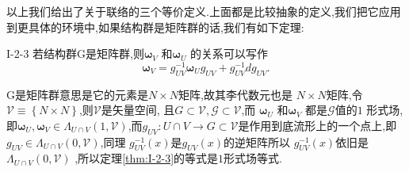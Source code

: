 \documentclass[../main.tex]{subfiles}
\begin{document}
以上我们给出了关于联络的三个等价定义.上面都是比较抽象的定义,我们把它应用到更具体的环境中,如果结构群是矩阵群的话,我们有如下定理:
\begin{theorem}
  {}{I-2-3}
  若结构群G是矩阵群,则$\bm{\omega}_V $ 和$\bm{\omega}_U $ 的关系可以写作\[
    \bm{\omega}_V = g_{UV}^{-1}\bm{\omega}_U g_{UV}^{} + g_{UV}^{-1} d g_{UV}^{}
  .\] 
\end{theorem}
\begin{note}
  G是矩阵群意思是它的元素是$N \times N$矩阵,故其李代数元也是 $N\times N$矩阵,令$\mathscr{V} \equiv \left\{ N\times N \right\} $,则$\mathscr{V}$是矢量空间,
  且$G \subset \mathscr{V},\mathscr{G}\subset \mathscr{V}$,而 $\bm{\omega}_U $ 和$\bm{\omega}_V $ 都是$\mathscr{G}$值的$1$ 形式场,即$\bm{\omega}_U,\bm{\omega}_V \in \Lambda_{U\cap V}(1,\mathscr{V})$,而$g_{UV}:U\cap V \rightarrow G \subset \mathscr{V}$是作用到底流形上的一个点上,即$g_{UV} \in \Lambda_{U\cap V}(0,\mathscr{V})$,同理 $g_{UV}^{-1}(x)$是$g_{UV}(x)$的逆矩阵所以 $g_{UV} ^{-1}(x)$依旧是$\Lambda_{U\cap V}(0,\mathscr{V})$
  ,所以定理\ref{thm:I-2-3}的等式是$1$形式场等式.
\end{note}
\end{document}
